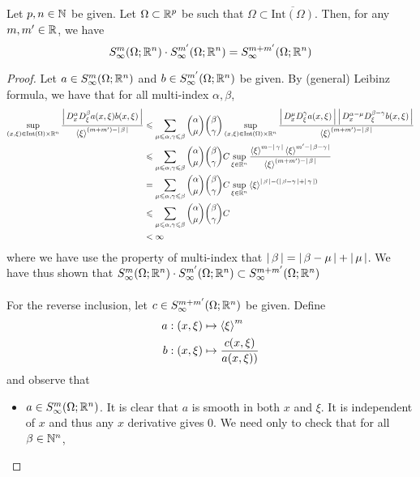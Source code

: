 \documentclass{article}
\begin{document}
\begin{fprop}
    Let $p, n \in \N$ be given. Let $\Omega \subset \R^p$ be such that $\Omega \subset \overline{\mathrm{Int}(\Omega)}$. Then, for any $m, m' \in \R$, we have 
    \[
    S^{m}_\infty(\Omega; \R^n) \cdot S^{m'}_\infty(\Omega; \R^n) = S^{m + m'}_\infty(\Omega; \R^n)
    \]
\end{fprop}
\begin{proof}
    Let $a \in S^{m}_\infty(\Omega; \R^n)$ and $b \in S^{m'}_\infty(\Omega; \R^n)$ be given. By (general) Leibinz formula, we have that for all multi-index $\alpha, \beta$, 
    \begin{align*}
    \sup_{(x, \xi) \in \mathrm{Int}(\Omega) \times \R^n} \frac{\abs{D^\alpha_x D^\beta_\xi a(x, \xi)b(x, \xi)}}{\sym[\xi]^{(m + m') - \abs{\beta}}} 
    &\leq  \sum_{\mu \leq \alpha, \gamma \leq \beta} \binom{\alpha}{\mu} \binom{\beta}{\gamma} \sup_{(x, \xi) \in \mathrm{Int}(\Omega) \times \R^n} \frac{\abs{D^\mu_x D^\gamma_\xi a(x, \xi)} \abs{D^{\alpha - \mu}_x D^{\beta - \gamma}_\xi b(x, \xi)}}{\sym[\xi]^{(m + m') - \abs{\beta}}} \\
    &\leq \sum_{\mu \leq \alpha, \gamma \leq \beta} \binom{\alpha}{\mu} \binom{\beta}{\gamma} C \sup_{\xi \in \R^n} \frac{\sym[\xi]^{m - \abs{\gamma}} \sym[\xi]^{m' - \abs{\beta - \gamma}}}{\sym[\xi]^{(m + m') - \abs{\beta}}} \\
    &= \sum_{\mu \leq \alpha, \gamma \leq \beta} \binom{\alpha}{\mu} \binom{\beta}{\gamma} C \sup_{\xi \in \R^n} \sym[\xi]^{\abs{\beta} - (\abs{\beta - \gamma} + \abs{\gamma})} \\
    & \leq \sum_{\mu \leq \alpha, \gamma \leq \beta} \binom{\alpha}{\mu} \binom{\beta}{\gamma} C \\
    &< \infty
    \end{align*}
    where we have use the property of multi-index that $\abs{\beta} = \abs{\beta - \mu} + \abs{\mu}$.  We have thus shown that $S^{m}_\infty(\Omega; \R^n) \cdot S^{m'}_\infty(\Omega; \R^n) \subset S^{m + m'}_\infty(\Omega; \R^n)$\\
    \\
    For the reverse inclusion, let $c \in S^{m + m'}_\infty(\Omega; \R^n)$ be given. Define 
    \begin{align*}
    a : (x, \xi) &\mapsto \sym[\xi]^m\\
    b: (x, \xi) &\mapsto \frac{c(x, \xi)}{a(x, \xi))}
    \end{align*}
    and observe that 
    \begin{itemize}
        \item $a \in S^{m}_\infty(\Omega; \R^n)$. It is clear that $a$ is smooth in both $x$ and $\xi$. It is independent of $x$ and thus any $x$ derivative gives 0. We need only to check that for all $\beta \in \N^n$, 

\end{itemize}
\end{proof}
\end{document}
